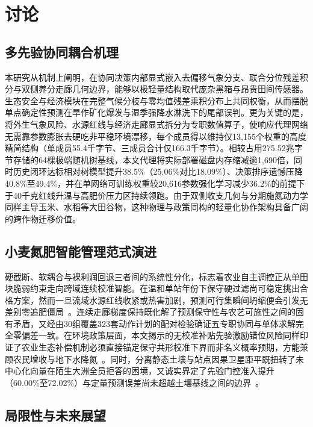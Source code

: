 \documentclass[11pt,a4paper]{article}
\begin{document}
\FloatBarrier

\section{讨论}

\subsection{多先验协同耦合机理}

本研究从机制上阐明，在协同决策内部显式嵌入去偏移气象分支、联合分位残差积分与双侧养分走廊几何边界，能够以极轻量结构取代庞杂黑箱与昂贵田间传感器。生态安全与经济模块在完整气候分枝与零均值残差乘积分布上共同权衡，从而摆脱单点确定性预测在旱作矿化爆发与湿季强降水淋洗下的尾部误判。更为关键的是，将外生气象风险、水源红线与经济走廊显式拆分为专职数值算子，使响应代理网络无需靠参数膨胀去硬吃非平稳环境漂移，每个成员得以维持仅13,155个权重的高度精简结构（单成员55.4千字节、三成员合计仅166.3千字节）。相较占用275.52兆字节存储的64棵极端随机树基线，本文代理将实际部署磁盘内存缩减逾1,690倍，同时历史闭环达标相对树模型提升38.5\%（25.06\%对比18.09\%）、决策排序遗憾压降40.8\%至49.4\%，并在单网络可训练权重较20,616参数强化学习减少36.2\%的前提下于40千克红线升温与高肥价压力区持续领跑。由于双侧收支几何与分期施氮动力学同样主导玉米、水稻等大田谷物，这种物理与政策同构的轻量化协作架构具备广阔的跨作物迁移价值。

\subsection{小麦氮肥智能管理范式演进}

硬截断、软耦合与裸利润回退三者间的系统性分化，标志着农业自主调控正从单田块脆弱约束走向跨域连续校准智能。在温和单站年份下保守硬过滤尚可稳定挑出合格方案，然而一旦流域水源红线收紧或热害加剧，预测可行集瞬间坍缩便会引发无差别零追肥僵局~\citep{baja2025}。连续走廊梯度保持既化解了预测保守性与农艺可施性之间的固有矛盾，又经由30组覆盖323套动作计划的配对检验确证五专职协同与单体求解完全零偏差一致。在环境政策层面，本文揭示的无校准补贴先验激励错位风险同样印证了农业生态补偿机制必须直接锚定保守共形校准下界而非名义概率预期，方能兼顾农民增收与地下水降氮~\citep{klages2020}。同时，分离静态土壤与站点因果卫星距平既扭转了未中心化向量在陌生大洲全员拒答的困境，又诚实界定了先验门控准入提升（60.00\%至72.02\%）与定量预测误差尚未超越土壤基线之间的边界~\citep{brown2025}。

\subsection{局限性与未来展望}
\end{document}
